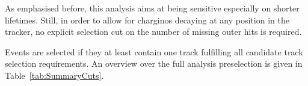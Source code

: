 As emphasised before, this analysis aims at being sensitive especially on shorter lifetimes.
Still, in order to allow for charginos decaying at any position in the tracker, no explicit selection cut on the number of missing outer hits is required.

Events are selected if they at least contain one track fulfilling all candidate track selection requirements.
An overview over the full analysis preselection is given in Table~\ref{tab:SummaryCuts}. 
\renewcommand{\arraystretch}{1.39}
\begin{table}[!h]
\centering
\caption{Summary and categorisation of the analysis selection.}
\label{tab:SummaryCuts}
\end{table}
